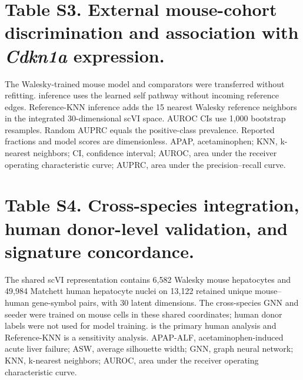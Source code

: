 
\clearpage

\clearpage

\clearpage
\section*{Table S3. External mouse-cohort discrimination and association with \textit{Cdkn1a} expression.}
\label{tab:S3}
\noindent The Walesky-trained mouse model and comparators were transferred without refitting. \SelfOnly{} inference uses the learned self pathway without incoming reference edges. Reference-KNN inference adds the 15 nearest Walesky reference neighbors in the integrated 30-dimensional scVI space. AUROC CIs use 1,000 bootstrap resamples. Random AUPRC equals the positive-class prevalence. Reported fractions and model scores are dimensionless. APAP, acetaminophen; KNN, k-nearest neighbors; CI, confidence interval; AUROC, area under the receiver operating characteristic curve; AUPRC, area under the precision--recall curve.


\clearpage

\clearpage
\section*{Table S4. Cross-species integration, human donor-level validation, and signature concordance.}
\label{tab:S4}
\noindent The shared scVI representation contains 6,582 Walesky mouse hepatocytes and 49,984 Matchett human hepatocyte nuclei on 13,122 retained unique mouse--human gene-symbol pairs, with 30 latent dimensions. The cross-species GNN and seeder were trained on mouse cells in these shared coordinates; human donor labels were not used for model training. \SelfOnly{} is the primary human analysis and Reference-KNN is a sensitivity analysis. APAP-ALF, acetaminophen-induced acute liver failure; ASW, average silhouette width; GNN, graph neural network; KNN, k-nearest neighbors; AUROC, area under the receiver operating characteristic curve.


\clearpage

\clearpage

\clearpage
